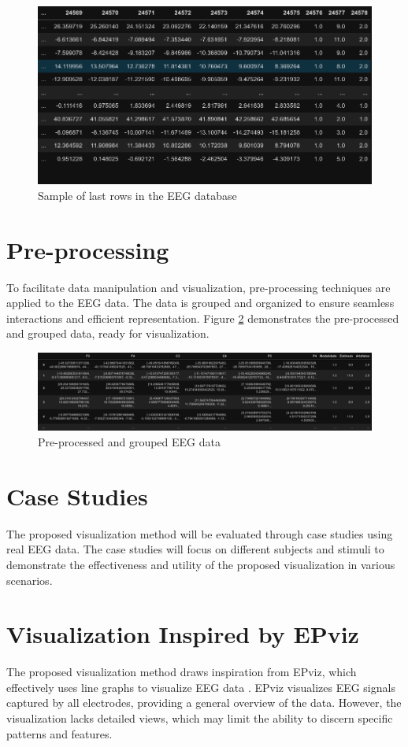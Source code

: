 \documentclass[format=acmtog]{acmart}
\begin{document}
	\begin{figure}
		\centering
		\includegraphics[width=.9\linewidth]{../presentation/images/visu05}
		\caption{Sample of last rows in the EEG database}
		\label{fig:visu05}
	\end{figure}
	
	\section{Pre-processing}
	To facilitate data manipulation and visualization, pre-processing techniques are applied to the EEG data. The data is grouped and organized to ensure seamless interactions and efficient representation. Figure \ref{fig:visu06} demonstrates the pre-processed and grouped data, ready for visualization.
	
	\begin{figure}
		\centering
		\includegraphics[width=\linewidth]{../presentation/images/visu06}
		\caption{Pre-processed and grouped EEG data}
		\label{fig:visu06}
	\end{figure}
	
	\section{Case Studies}
	The proposed visualization method will be evaluated through case studies using real EEG data. The case studies will focus on different subjects and stimuli to demonstrate the effectiveness and utility of the proposed visualization in various scenarios.
	
	\section{Visualization Inspired by EPviz \cite{currey2023epviz}}
	The proposed visualization method draws inspiration from EPviz, which effectively uses line graphs to visualize EEG data \cite{currey2023epviz}. EPviz visualizes EEG signals captured by all electrodes, providing a general overview of the data. However, the visualization lacks detailed views, which may limit the ability to discern specific patterns and features.
	
\end{document}
